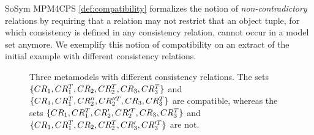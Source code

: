 \begin{copiedFrom}{SoSym MPM4CPS}
\autoref{def:compatibility} formalizes the notion of \emph{non-contradictory} relations by requiring that a relation may not restrict that an object tuple, for which consistency is defined in any consistency relation, cannot occur in a model set anymore.
We exemplify this notion of compatibility on an extract of the initial example with different consistency relations.


\begin{figure}
    \centering
    
    \caption[Examples for different incompatibility scenarios]{Three metamodels with different consistency relations. The sets $\{ CR_{1}, CR^T_{1},CR_{2}, CR^T_{2}, CR_{3}, CR^T_{3} \}$ and $\{ CR_{1}, CR^T_{1}, CR''_{2}, CR''^T_{2}, CR_{3}, CR^T_{3} \}$ are compatible, whereas the sets $\{ CR_{1}, CR^T_{1}, CR'_{2}, CR'^T_{2}, CR_{3}, CR^T_{3} \}$ and $\{ CR_{1}, CR^T_{1}, CR_{2}, CR^T_{2}, CR'_{3}, CR'^T_{3} \}$ are not.}
    \label{fig:correctness:formal:incompatibility_example}
\end{figure}


\end{copiedFrom}
